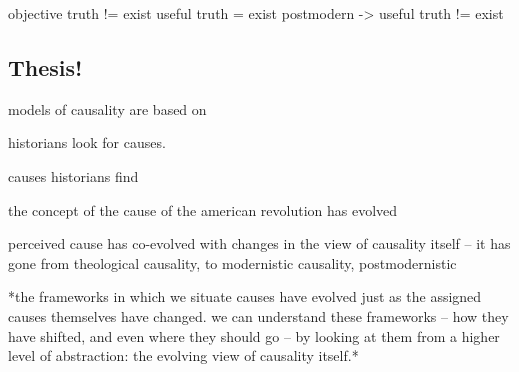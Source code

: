 \documentclass[letterpaper]{article}
\begin{document}
objective truth != exist useful truth = exist postmodern -> useful truth
!= exist

\subsection{Thesis!}
\label{sec:orgee5e1b3}
models of causality are based on

historians look for causes.

causes historians find

the concept of the cause of the american revolution has evolved

perceived cause has co-evolved with changes in the view of causality
itself -- it has gone from theological causality, to modernistic
causality, postmodernistic

*the frameworks in which we situate causes have evolved just as the
assigned causes themselves have changed. we can understand these
frameworks -- how they have shifted, and even where they should go -- by
looking at them from a higher level of abstraction: the evolving view of
causality itself.*
\end{document}
